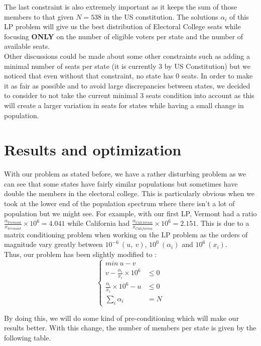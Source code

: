 \documentclass[a4paper,9pt,calibri,oneside,openany, twocolumn]{report}
\theoremstyle{break}
\begin{document}
The last constraint is also extremely important as it keeps the sum of those members to that given $N=538$ in the US constitution. The solutions $\alpha_i$ of this LP problem will give us the best distribution of Electoral College seats while focusing \textbf{ONLY} on the number of eligible voters per state and the number of available seats. \\

Other discussions could be made about some other constraints such as adding a minimal number of seats per state (it is currently 3 by US Constitution) but we noticed that even without that constraint, no state has $0$ seats. In order to make it as fair as possible and to avoid large discrepancies between states, we decided to consider to not take the current minimal 3 seats condition into account as this will create a larger variation in seats for states while having a small change in population.

\section*{Results and optimization}
\qquad With our problem as stated before, we have a rather disturbing problem as we can see that some states have fairly similar populations but sometimes have double the members in the electoral college. This is particularly obvious when we took at the lower end of the population spectrum where there isn't a lot of population but we might see. For example, with our first LP, Vermont had a ratio $\frac{\alpha_{Vermont}}{x_{Vermont}}\times10^6=4.041$ while California had $\frac{\alpha_{California}}{x_{California}}\times10^6=2.151$. This is due to a matrix conditioning problem when working on the LP problem as the orders of magnitude vary greatly between $10^{-6}\ (u,\ v)$, $10^0\ (\alpha_i)$ and $10^6\ (x_i)$.\\

Thus, our problem has been slightly modified to :
\begin{equation}
	\begin{cases}
	min\ u-v& \\
	v - \frac{\alpha_i}{x_i}\times 10^6&\leq 0\\
	\frac{\alpha_i}{x_i}\times 10^6 - u &\leq 0\\
	\sum\limits_i \alpha_i &= N
	\end{cases}
\end{equation}

By doing this, we will do some kind of pre-conditioning which will make our results better. With this change, the number of members per state is given by the following table.\\
\end{document}
